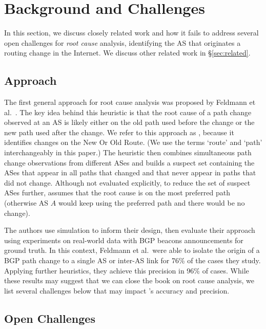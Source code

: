 \section{Background and Challenges}
\label{sec:challenges}

In this section, we discuss closely related work and how it fails to
address several open challenges for \emph{root cause}
analysis, \ie identifying the AS that originates a routing change
in the Internet.\footnotemark{} We discuss other related work in \S\ref{sec:related}.


\subsection{\feldmannbold Approach}

The first general approach for root cause analysis was proposed by Feldmann et al.~\cite{feldman}.  The
key idea behind this heuristic is that the root cause of a path change
observed at an AS is likely either on the old path used before the change or
the new path used after the change. We refer to this approach as
\feldmann, because it identifies changes on the New Or Old Route. (We
use the terms `route' and `path' interchangeably in this paper.) The heuristic 
then combines simultaneous path change observations from
different ASes and builds a suspect set containing the ASes that appear
in all paths that changed and that never appear in paths that did not
change. Although not evaluated explicitly, to reduce the set of suspect
ASes further, \feldmann assumes that the root cause is on the most
preferred path (otherwise AS $A$ would keep using the preferred path and
there would be no change). 


The authors use simulation to inform their design, then evaluate their approach using 
experiments on real-world data with BGP beacons announcements for ground truth. 
In this context, Feldmann et al.~were able to isolate the origin of a
BGP path change to a single AS or inter-AS link for 76\% of the cases
they study. Applying further heuristics, they achieve this precision 
in 96\% of cases.
While these results may suggest that we can close the book
on root cause analysis, we list several challenges below that may impact
\feldmann's accuracy and precision.


\subsection{Open Challenges}

